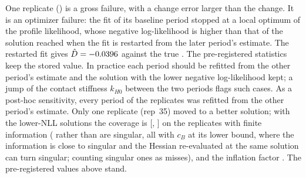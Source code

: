 One replicate (\KapGrossReps) is a gross failure, with a change error larger than the change. It is an
optimizer failure: the fit of its baseline period stopped at a local optimum of the profile likelihood,
whose negative log-likelihood is \KapRepThirtyFiveNLLGap{} higher than that of the solution reached when
the fit is restarted from the later period's estimate. The restarted fit gives
$\hat D=- 0.0396$ against the true \KapRepThirtyFiveTrueD. The pre-registered statistics
keep the stored value. In practice each period should be refitted from the other period's estimate and
the solution with the lower negative log-likelihood kept; a jump of the contact stiffness $k_{H0}$ between
the two periods flags such cases.
As a post-hoc sensitivity, every period of the \KapTwoStartN{} replicates was refitted from the other
period's estimate. Only one replicate (rep~35) moved to a better solution; with the lower-NLL solutions
the coverage is \KapTwoStartCov{} [\KapTwoStartCovLo, \KapTwoStartCovHi] on the \KapTwoStartNFinite{}
replicates with finite information (\KapTwoStartNSing{} rather than \KapCoestNSing{} are singular, all
with $c_B$ at its lower bound, where the information is close to singular and the Hessian re-evaluated
at the same solution can turn singular; \KapTwoStartCovSingMiss{} counting singular ones as misses), and
the inflation factor \KapTwoStartInfl{}. The pre-registered values above stand.
